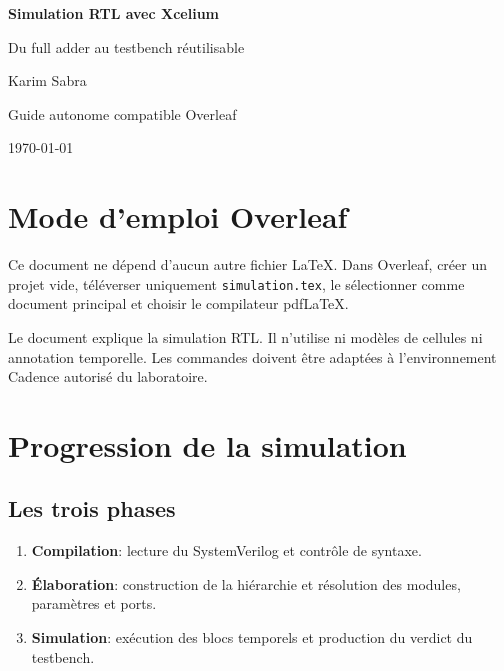 \documentclass[11pt,a4paper,openany]{report}
\begin{document}
\begin{titlepage}
  \centering
  \vspace*{28mm}
  {\Huge\bfseries\color{GuideBlue}Simulation RTL avec Xcelium\par}
  \vspace{7mm}
  {\LARGE Du full adder au testbench réutilisable\par}
  \vfill
  {\Large Karim Sabra\par}
  \vspace{4mm}
  {Guide autonome compatible Overleaf\par}
  {\today\par}
\end{titlepage}

\chapter*{Mode d'emploi Overleaf}

Ce document ne dépend d'aucun autre fichier LaTeX. Dans Overleaf, créer un
projet vide, téléverser uniquement \texttt{simulation.tex}, le sélectionner
comme document principal et choisir le compilateur pdfLaTeX.

\begin{warningbox}[Portée]
Le document explique la simulation RTL. Il n'utilise ni modèles de cellules ni
annotation temporelle. Les commandes doivent être adaptées à l'environnement
Cadence autorisé du laboratoire.
\end{warningbox}

\tableofcontents

\chapter{Progression de la simulation}

\section{Les trois phases}

\begin{enumerate}
  \item \textbf{Compilation}: lecture du SystemVerilog et contrôle de syntaxe.
  \item \textbf{Élaboration}: construction de la hiérarchie et résolution des
    modules, paramètres et ports.
  \item \textbf{Simulation}: exécution des blocs temporels et production du
    verdict du testbench.
\end{enumerate}
\end{document}

